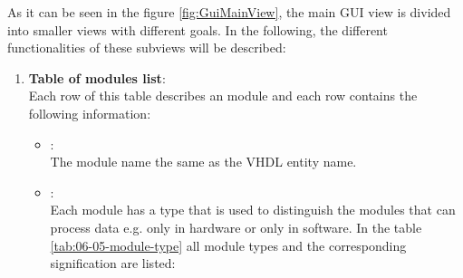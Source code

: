 	As it can be seen in the figure \ref{fig:GuiMainView}, the main GUI view is divided into smaller views with different goals. In the following, the different functionalities of these subviews will be described:
	\begin{enumerate}
		\item \textbf{Table of \asterics modules list}:\\
			Each row of this table describes an \asterics module and each row contains the following information:
		\begin{itemize}
			\item {}:\\
				The module name the same as the VHDL entity name.
			\item {}: \\
				Each module has a type that is used to distinguish the modules that can process data e.g. only in hardware or only in software. In the table \ref{tab:06-05-module-type} all module types and the corresponding signification are listed:


\end{itemize}
\end{enumerate}
